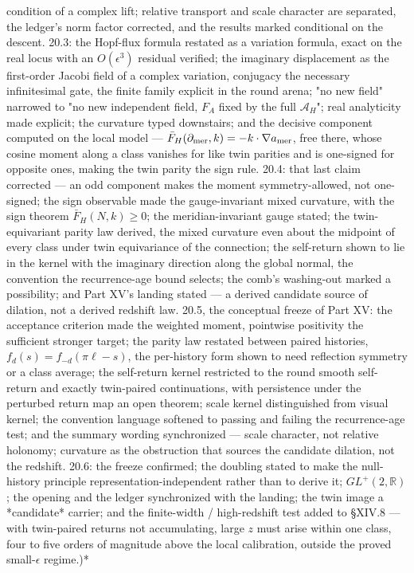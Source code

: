 condition of a complex lift; relative transport and scale character are separated, the ledger's norm factor corrected, and the results marked conditional on the descent. 20.3: the Hopf-flux formula restated as a variation formula, exact on the real locus with an $O(\epsilon^3)$ residual verified; the imaginary displacement as the first-order Jacobi field of a complex variation, conjugacy the necessary infinitesimal gate, the finite family explicit in the round arena; "no new field" narrowed to "no new independent field, $F_A$ fixed by the full $\mathcal A_H$"; real analyticity made explicit; the curvature typed downstairs; and the decisive component computed on the local model — $\bar F_H(\partial_{\rm mer},k) = -k\cdot\nabla a_{\rm mer}$, free there, whose cosine moment along a class vanishes for like twin parities and is one-signed for opposite ones, making the twin parity the sign rule. 20.4: that last claim corrected — an odd component makes the moment symmetry-allowed, not one-signed; the sign observable made the gauge-invariant mixed curvature, with the sign theorem $\bar F_H(N,k)\ge0$; the meridian-invariant gauge stated; the twin-equivariant parity law derived, the mixed curvature even about the midpoint of every class under twin equivariance of the connection; the self-return shown to lie in the kernel with the imaginary direction along the global normal, the convention the recurrence-age bound selects; the comb's washing-out marked a possibility; and Part XV's landing stated — a derived candidate source of dilation, not a derived redshift law. 20.5, the conceptual freeze of Part XV: the acceptance criterion made the weighted moment, pointwise positivity the sufficient stronger target; the parity law restated between paired histories, $f_d(s) = f_{-d}(\pi\ell-s)$, the per-history form shown to need reflection symmetry or a class average; the self-return kernel restricted to the round smooth self-return and exactly twin-paired continuations, with persistence under the perturbed return map an open theorem; scale kernel distinguished from visual kernel; the convention language softened to passing and failing the recurrence-age test; and the summary wording synchronized — scale character, not relative holonomy; curvature as the obstruction that sources the candidate dilation, not the redshift. 20.6: the freeze confirmed; the doubling stated to make the null-history principle representation-independent rather than to derive it; $GL^+(2,\mathbb R)$; the opening and the ledger synchronized with the landing; the twin image a *candidate* carrier; and the finite-width / high-redshift test added to §XIV.8 — with twin-paired returns not accumulating, large $z$ must arise within one class, four to five orders of magnitude above the local calibration, outside the proved small-$\epsilon$ regime.)*
